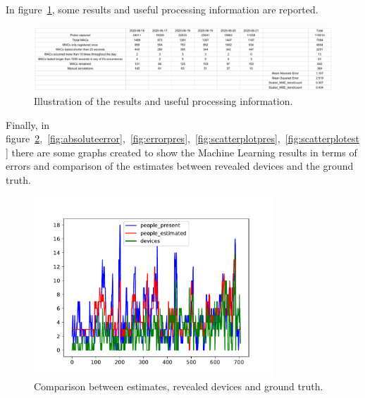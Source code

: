 In figure~\ref{fig:testresults}, some results and useful processing information are reported.

\begin{figure}[h]
\centering 
\includegraphics[width=1\textwidth]{images/testresults} 
\caption{Illustration of the results and useful processing information.}
\label{fig:testresults}
\end{figure}


Finally, in figure~\ref{fig:comparison},~\ref{fig:absoluteerror},~\ref{fig:errorpres},~\ref{fig:scatterplotpres},~\ref{fig:scatterplotest} there are some graphs created to show the Machine Learning results in terms of errors and comparison of the estimates between revealed devices and the ground truth.

\begin{figure}[h]
\centering 
\includegraphics[width=0.8\textwidth]{images/comparison} 
\caption{Comparison between estimates, revealed devices and ground truth.}
\label{fig:comparison}
\end{figure}

